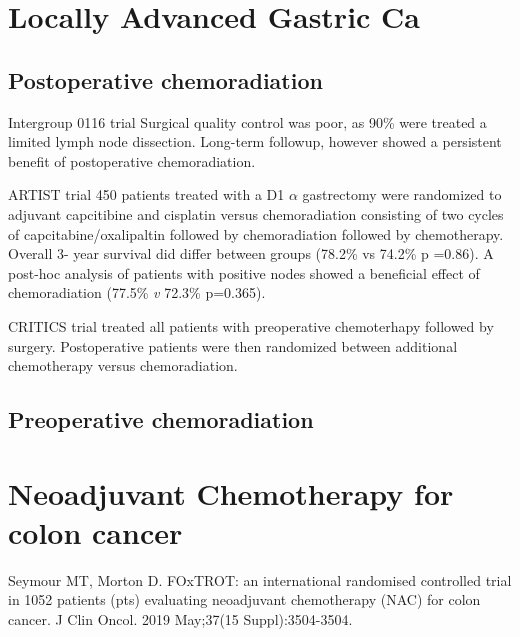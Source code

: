 \documentclass[
]{book}
\begin{document}
\hypertarget{locally-advanced-gastric-ca}{%
\chapter{Locally Advanced Gastric Ca}\label{locally-advanced-gastric-ca}}

\hypertarget{postoperative-chemoradiation-1}{%
\section{Postoperative chemoradiation}\label{postoperative-chemoradiation-1}}

Intergroup 0116 trial \citep{macdonald725}
Surgical quality control was poor, as 90\% were treated a limited lymph node dissection. Long-term followup, however \citep{smalley2327} showed a persistent benefit of postoperative chemoradiation.

ARTIST trial 450 patients treated with a D1 \(\alpha\) gastrectomy were randomized to adjuvant capcitibine and cisplatin versus chemoradiation consisting of two cycles of capcitabine/oxalipaltin followed by chemoradiation followed by chemotherapy. Overall 3- year survival did differ between groups (78.2\% vs 74.2\% p =0.86). A post-hoc analysis of patients with positive nodes showed a beneficial effect of chemoradiation (77.5\% \emph{v} 72.3\% p=0.365).\citep{lee268}

CRITICS trial treated all patients with preoperative chemoterhapy followed by surgery. Postoperative patients were then randomized between additional chemotherapy versus chemoradiation.

\hypertarget{preoperative-chemoradiation}{%
\section{Preoperative chemoradiation}\label{preoperative-chemoradiation}}

\citep{ajani3953}

\hypertarget{neoadjuvant-chemotherapy-for-colon-cancer}{%
\chapter{Neoadjuvant Chemotherapy for colon cancer}\label{neoadjuvant-chemotherapy-for-colon-cancer}}

Seymour MT, Morton D. FOxTROT: an international randomised controlled trial in 1052 patients (pts) evaluating neoadjuvant chemotherapy (NAC) for colon cancer. J Clin Oncol. 2019 May;37(15 Suppl):3504-3504.
\end{document}
